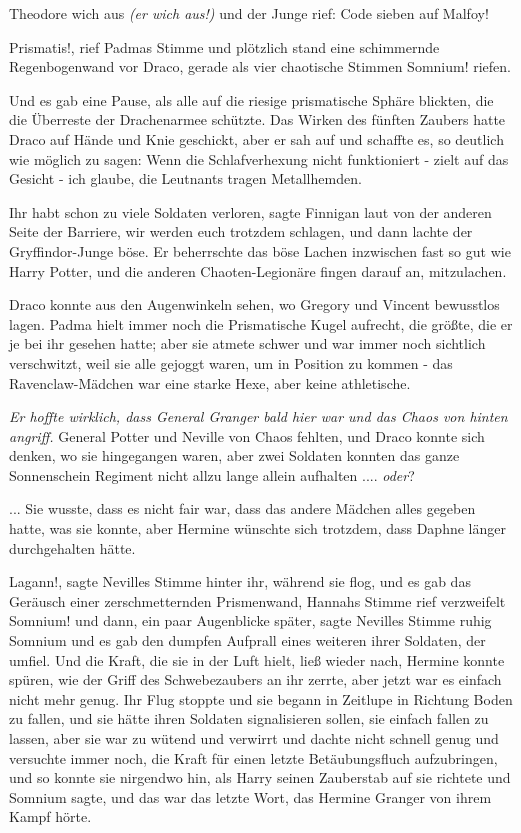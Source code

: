 Theodore wich aus \emph{(er wich aus!)} und der Junge rief: \glqq{}Code sieben
auf Malfoy!\grqq{}

\glqq{}Prismatis!\grqq{}, rief Padmas Stimme und plötzlich stand eine schimmernde
Regenbogenwand vor Draco, gerade als vier chaotische Stimmen \glqq{}
Somnium!\grqq{} riefen.

Und es gab eine Pause, als alle auf die riesige prismatische Sphäre blickten,
die die Überreste der Drachenarmee schützte. Das Wirken des fünften Zaubers
hatte Draco auf Hände und Knie geschickt, aber er sah auf und schaffte es, so
deutlich wie möglich zu sagen: \glqq{}Wenn die Schlafverhexung nicht funktioniert
- zielt auf das Gesicht - ich glaube, die Leutnants tragen Metallhemden.\grqq{}

\glqq{}Ihr habt schon zu viele Soldaten verloren\grqq{}, sagte Finnigan laut von
der anderen Seite der Barriere, \glqq{}wir werden euch trotzdem schlagen\grqq{},
und dann lachte der Gryffindor-Junge böse. Er beherrschte das böse Lachen
inzwischen fast so gut wie Harry Potter, und die anderen Chaoten-Legionäre
fingen darauf an, mitzulachen.

Draco konnte aus den Augenwinkeln sehen, wo Gregory und Vincent bewusstlos
lagen. Padma hielt immer noch die Prismatische Kugel aufrecht, die größte, die
er je bei ihr gesehen hatte; aber sie atmete schwer und war immer noch sichtlich
verschwitzt, weil sie alle gejoggt waren, um in Position zu kommen - das
Ravenclaw-Mädchen war eine starke Hexe, aber keine athletische.

\emph{Er hoffte wirklich, dass General Granger bald hier war und das Chaos von
hinten angriff.} General Potter und Neville von Chaos fehlten, und Draco konnte
sich denken, wo sie hingegangen waren, aber zwei Soldaten konnten das ganze
Sonnenschein Regiment nicht allzu lange allein aufhalten .... \emph{oder}?

... Sie wusste, dass es nicht fair war, dass das andere Mädchen alles gegeben
hatte, was sie konnte, aber Hermine wünschte sich trotzdem, dass Daphne länger
durchgehalten hätte.

\glqq{}Lagann!\grqq{}, sagte Nevilles Stimme hinter ihr, während sie flog, und es
gab das Geräusch einer zerschmetternden Prismenwand, Hannahs Stimme rief
verzweifelt \glqq{}Somnium!\grqq{} und dann, ein paar Augenblicke später, sagte
Nevilles Stimme ruhig \glqq{}Somnium\grqq{} und es gab den dumpfen Aufprall eines
weiteren ihrer Soldaten, der umfiel. Und die Kraft, die sie in der Luft hielt,
ließ wieder nach, Hermine konnte spüren, wie der Griff des Schwebezaubers an ihr
zerrte, aber jetzt war es einfach nicht mehr genug. Ihr Flug stoppte und sie
begann in Zeitlupe in Richtung Boden zu fallen, und sie hätte ihren Soldaten
signalisieren sollen, sie einfach fallen zu lassen, aber sie war zu wütend und
verwirrt und dachte nicht schnell genug und versuchte immer noch, die Kraft für
einen letzte Betäubungsfluch aufzubringen, und so konnte sie nirgendwo hin, als
Harry seinen Zauberstab auf sie richtete und \glqq{}Somnium\grqq{} sagte, und das
war das letzte Wort, das Hermine Granger von ihrem Kampf hörte.

